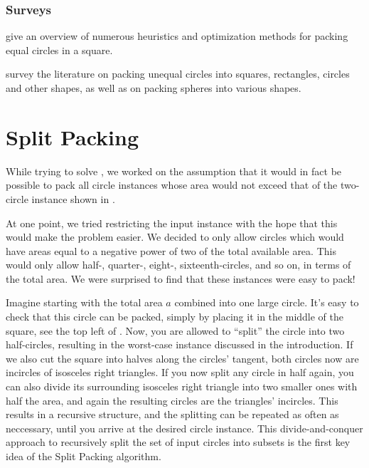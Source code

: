 \documentclass[a4paper,style=print,bibliography=totoc,nexus,lnum,extramargin]{tubsbook}
\begin{document}
\subsection{Surveys}

\textcite{SMCSCG2007new} give an overview of numerous heuristics and optimization methods for packing equal circles in a square.

\textcite{HM2009literature} survey the literature on packing unequal circles into squares, rectangles, circles and other shapes, as well as on packing spheres into various shapes.

\chapter{Split Packing}

While trying to solve , we worked on the assumption that it would in fact be possible to pack all circle instances whose area would not exceed that of the two-circle instance shown in .%


At one point, we tried restricting the input instance with the hope that this would make the problem easier. We decided to only allow circles which would have areas equal to a negative power of two of the total available area. This would only allow half-, quarter-, eight-, sixteenth-circles, and so on, in terms of the total area. We were surprised to find that these instances were easy to pack!

Imagine starting with the total area $a$ combined into one large circle. It's easy to check that this circle can be packed, simply by placing it in the middle of the square, see the top left of . Now, you are allowed to “split” the circle into two half-circles, resulting in the worst-case instance discussed in the introduction. If we also cut the square into halves along the circles' tangent, both circles now are incircles of isosceles right triangles.
If you now split any circle in half again, you can also divide its surrounding isosceles right triangle into two smaller ones with half the area, and again the resulting circles are the triangles' incircles.
This results in a recursive structure, and the splitting can be repeated as often as neccessary, until you arrive at the desired circle instance. This divide-and-conquer approach to recursively split the set of input circles into subsets is the first key idea of the Split Packing algorithm.
\end{document}
